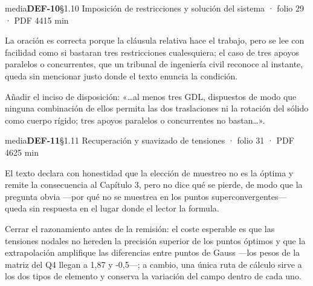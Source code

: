 {\small{}\par}
\begin{ficha}{media}{\casilla\textbf{DEF-10}\quad{}\quad §1.10 Imposición de restricciones y solución del sistema · folio 29 · PDF 44\hfill 15 min}
\par
{}La oración es correcta porque la cláusula relativa hace el trabajo, pero se lee con facilidad como si bastaran tres restricciones cualesquiera; el caso de tres apoyos paralelos o concurrentes, que un tribunal de ingeniería civil reconoce al instante, queda sin mencionar justo donde el texto enuncia la condición.\par
{}Añadir el inciso de disposición: «…al menos tres GDL, dispuestos de modo que ninguna combinación de ellos permita las dos traslaciones ni la rotación del sólido como cuerpo rígido; tres apoyos paralelos o concurrentes no bastan…».\par
\end{ficha}
\begin{ficha}{media}{\casilla\textbf{DEF-11}\quad{}\quad §1.11 Recuperación y suavizado de tensiones · folio 31 · PDF 46\hfill 25 min}
\par
{}El texto declara con honestidad que la elección de muestreo no es la óptima y remite la consecuencia al Capítulo 3, pero no dice qué se pierde, de modo que la pregunta obvia —por qué no se muestrea en los puntos superconvergentes— queda sin respuesta en el lugar donde el lector la formula.\par
{}Cerrar el razonamiento antes de la remisión: el coste esperable es que las tensiones nodales no hereden la precisión superior de los puntos óptimos y que la extrapolación amplifique las diferencias entre puntos de Gauss —los pesos de la matriz del Q4 llegan a 1,87 y -0,5—; a cambio, una única ruta de cálculo sirve a los dos tipos de elemento y conserva la variación del campo dentro de cada uno.\par
\end{ficha}
